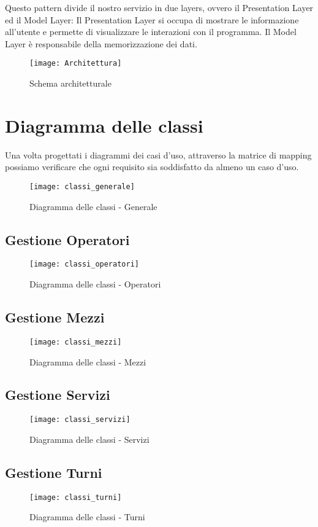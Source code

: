 \documentclass[green, fancy, 11pt]{elegantbook}
\begin{document}
Questo pattern divide il nostro servizio in due layers, ovvero il Presentation Layer ed il Model Layer:
Il Presentation Layer si occupa di mostrare le informazione all'utente e permette di visualizzare le interazioni con il programma.
Il Model Layer è responsabile della memorizzazione dei dati.
\\
\begin{figure}[H]
	\centering
	\texttt{[image: Architettura]}
	\caption{Schema architetturale}
\end{figure}

\newpage
\section{Diagramma delle classi}
Una volta progettati i diagrammi dei casi d'uso, attraverso la matrice di mapping possiamo verificare che ogni requisito sia soddisfatto da almeno un caso d'uso.
\\
\begin{figure}[H]
	\centering
	\texttt{[image: classi\_generale]}
	\caption{Diagramma delle classi - Generale}
\end{figure}
\newpage

\subsection{Gestione Operatori}
\begin{figure}[H]
	\centering
	\texttt{[image: classi\_operatori]}
	\caption{Diagramma delle classi - Operatori}
\end{figure}
\subsection{Gestione Mezzi}
\begin{figure}[H]
	\centering
	\texttt{[image: classi\_mezzi]}
	\caption{Diagramma delle classi - Mezzi}
\end{figure}
\newpage

\subsection{Gestione Servizi}
\begin{figure}[H]
	\centering
	\texttt{[image: classi\_servizi]}
	\caption{Diagramma delle classi - Servizi}
\end{figure}
\subsection{Gestione Turni}
\begin{figure}[H]
	\centering
	\texttt{[image: classi\_turni]}
	\caption{Diagramma delle classi - Turni}
\end{figure}
\newpage
\end{document}
